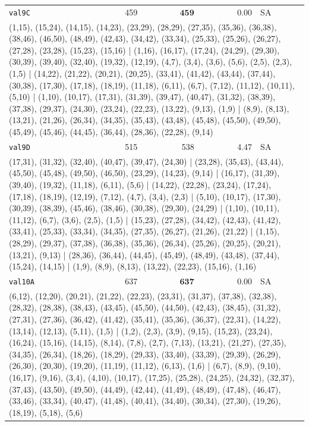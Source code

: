 \begin{longtable}{lrrrl}
\texttt{val9C} & 459 & $\mathbf{459}$ & 0.00 & SA \\
\multicolumn{5}{p{0.96\linewidth}}{\tiny\raggedright\arraybackslash (1,15), (15,24), (14,15), (14,23), (23,29), (28,29), (27,35), (35,36), (36,38), (38,46), (46,50), (48,49), (42,43), (34,42), (33,34), (25,33), (25,26), (26,27), (27,28), (23,28), (15,23), (15,16) | (1,16), (16,17), (17,24), (24,29), (29,30), (30,39), (39,40), (32,40), (19,32), (12,19), (4,7), (3,4), (3,6), (5,6), (2,5), (2,3), (1,5) | (14,22), (21,22), (20,21), (20,25), (33,41), (41,42), (43,44), (37,44), (30,38), (17,30), (17,18), (18,19), (11,18), (6,11), (6,7), (7,12), (11,12), (10,11), (5,10) | (1,10), (10,17), (17,31), (31,39), (39,47), (40,47), (31,32), (38,39), (37,38), (29,37), (24,30), (23,24), (22,23), (13,22), (9,13), (1,9) | (8,9), (8,13), (13,21), (21,26), (26,34), (34,35), (35,43), (43,48), (45,48), (45,50), (49,50), (45,49), (45,46), (44,45), (36,44), (28,36), (22,28), (9,14)} \\[2pt]
\texttt{val9D} & 515 & 538 & 4.47 & SA \\
\multicolumn{5}{p{0.96\linewidth}}{\tiny\raggedright\arraybackslash (17,31), (31,32), (32,40), (40,47), (39,47), (24,30) | (23,28), (35,43), (43,44), (45,50), (45,48), (49,50), (46,50), (23,29), (14,23), (9,14) | (16,17), (31,39), (39,40), (19,32), (11,18), (6,11), (5,6) | (14,22), (22,28), (23,24), (17,24), (17,18), (18,19), (12,19), (7,12), (4,7), (3,4), (2,3) | (5,10), (10,17), (17,30), (30,39), (38,39), (45,46), (38,46), (30,38), (29,30), (24,29) | (1,10), (10,11), (11,12), (6,7), (3,6), (2,5), (1,5) | (15,23), (27,28), (34,42), (42,43), (41,42), (33,41), (25,33), (33,34), (34,35), (27,35), (26,27), (21,26), (21,22) | (1,15), (28,29), (29,37), (37,38), (36,38), (35,36), (26,34), (25,26), (20,25), (20,21), (13,21), (9,13) | (28,36), (36,44), (44,45), (45,49), (48,49), (43,48), (37,44), (15,24), (14,15) | (1,9), (8,9), (8,13), (13,22), (22,23), (15,16), (1,16)} \\[2pt]
\texttt{val10A} & 637 & $\mathbf{637}$ & 0.00 & SA \\
\multicolumn{5}{p{0.96\linewidth}}{\tiny\raggedright\arraybackslash (6,12), (12,20), (20,21), (21,22), (22,23), (23,31), (31,37), (37,38), (32,38), (28,32), (28,38), (38,43), (43,45), (45,50), (44,50), (42,43), (38,45), (31,32), (27,31), (27,36), (36,42), (41,42), (35,41), (35,36), (36,37), (22,31), (14,22), (13,14), (12,13), (5,11), (1,5) | (1,2), (2,3), (3,9), (9,15), (15,23), (23,24), (16,24), (15,16), (14,15), (8,14), (7,8), (2,7), (7,13), (13,21), (21,27), (27,35), (34,35), (26,34), (18,26), (18,29), (29,33), (33,40), (33,39), (29,39), (26,29), (26,30), (20,30), (19,20), (11,19), (11,12), (6,13), (1,6) | (6,7), (8,9), (9,10), (16,17), (9,16), (3,4), (4,10), (10,17), (17,25), (25,28), (24,25), (24,32), (32,37), (37,43), (43,50), (49,50), (44,49), (42,44), (41,49), (48,49), (47,48), (46,47), (33,46), (33,34), (40,47), (41,48), (40,41), (34,40), (30,34), (27,30), (19,26), (18,19), (5,18), (5,6)} \\[2pt]

\end{longtable}

